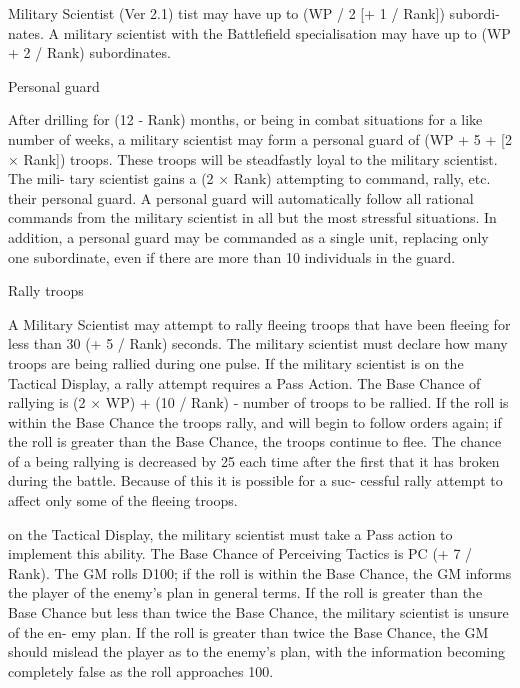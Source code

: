 \begin{Chapter}{Military Scientist (Ver 2.1)}
tist may have up to (WP / 2 [+ 1 / Rank]) subordi-
nates.  A  military  scientist  with  the  Battlefield 
specialisation  may  have  up  to  (WP  +  2  /  Rank) 
subordinates. 

Personal guard 

After  drilling  for  (12  -  Rank)  months,  or  being  in 
combat  situations  for  a  like  number  of  weeks,  a 
military  scientist  may  form  a  personal  guard  of 
(WP + 5 + [2 × Rank]) troops. These troops will be 
steadfastly loyal to the military scientist. The mili-
tary  scientist  gains  a  (2  ×  Rank)%
attempting  to  command,  rally,  etc.  their  personal 
guard.  A  personal  guard  will  automatically  follow 
all rational commands from the military scientist in 
all  but  the  most  stressful  situations.  In  addition,  a 
personal  guard  may  be  commanded  as  a  single 
unit,  replacing  only  one  subordinate,  even  if  there 
are more than 10 individuals in the guard. 

Rally troops 

A  Military  Scientist  may  attempt  to  rally  fleeing 
troops that have been fleeing for less than 30 (+ 5 / 
Rank) seconds. The military scientist must declare 
how  many  troops  are  being  rallied  during  one 
pulse.  If  the  military  scientist  is  on  the  Tactical 
Display, a rally attempt requires a Pass Action. The 
Base Chance of rallying is (2 × WP) + (10 / Rank) 
- number of troops to be rallied. If the roll is within 
the Base Chance the troops rally, and will begin to 
follow  orders  again;  if  the  roll  is  greater  than  the 
Base  Chance,  the  troops  continue  to  flee.  The 
chance of a being rallying is decreased by 25%
each  time  after  the  first  that  it  has  broken  during 
the  battle.  Because  of  this  it  is  possible  for  a  suc-
cessful  rally  attempt  to  affect  only  some  of  the 
fleeing troops. 

on the Tactical Display, the military scientist must 
take  a  Pass  action  to  implement  this  ability.  The 
Base  Chance  of  Perceiving  Tactics  is  PC  (+  7  / 
Rank). The GM rolls D100; if the roll is within the 
Base  Chance,  the  GM  informs  the  player  of  the 
enemy’s plan in general terms. If the roll is greater 
than the Base Chance but less than twice the Base 
Chance,  the  military  scientist  is  unsure  of  the  en-
emy plan. If the roll is greater than twice the Base 
Chance, the GM should mislead the player as to the 
enemy’s  plan,  with  the  information  becoming 
completely false as the roll approaches 100. 


\end{Chapter}
